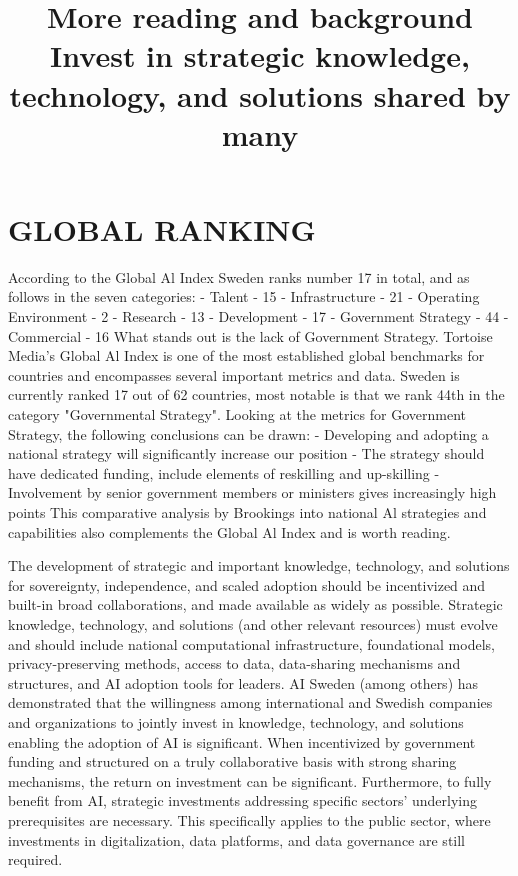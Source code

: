 \title{
More reading and background
}
\section*{GLOBAL RANKING}
According to the Global Al Index Sweden ranks number 17 in total, and as follows in the seven categories:
- Talent - 15
- Infrastructure - 21
- Operating Environment - 2
- Research - 13
- Development - 17
- Government Strategy - 44
- Commercial - 16
What stands out is the lack of Government Strategy.
Tortoise Media's Global Al Index is one of the most established global benchmarks for countries and encompasses several important metrics and data.
Sweden is currently ranked 17 out of 62 countries, most notable is that we rank 44th in the category "Governmental Strategy". Looking at the metrics for Government Strategy, the following conclusions can be drawn:
- Developing and adopting a national strategy will significantly increase our position
- The strategy should have dedicated funding, include elements of reskilling and up-skilling
- Involvement by senior government members or ministers gives increasingly high points
This comparative analysis by Brookings into national Al strategies and capabilities also complements the Global Al Index and is worth reading.

\title{
Invest in strategic knowledge, technology, and solutions shared by many
}
The development of strategic and important knowledge, technology, and solutions for sovereignty, independence, and scaled adoption should be incentivized and built-in broad collaborations, and made available as widely as possible. Strategic knowledge, technology, and solutions (and other relevant resources) must evolve and should include national computational infrastructure, foundational models, privacy-preserving methods, access to data, data-sharing mechanisms and structures, and AI adoption tools for leaders.
AI Sweden (among others) has demonstrated that the willingness among international and Swedish companies and organizations to jointly invest in knowledge, technology, and solutions enabling the adoption of AI is significant. When incentivized by government funding and structured on a truly collaborative basis with strong sharing mechanisms, the return on investment can be significant.
Furthermore, to fully benefit from AI, strategic investments addressing specific sectors' underlying prerequisites are necessary. This specifically applies to the public sector, where investments in digitalization, data platforms, and data governance are still required.

